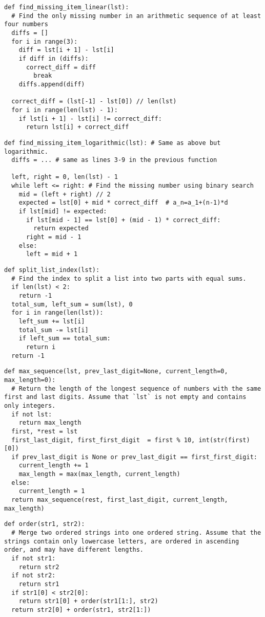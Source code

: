 \documentclass[11pt]{article}
\begin{document}
\begin{lstlisting}
def find_missing_item_linear(lst):
  # Find the only missing number in an arithmetic sequence of at least four numbers
  diffs = []
  for i in range(3):
    diff = lst[i + 1] - lst[i]
    if diff in (diffs):
      correct_diff = diff
        break
    diffs.append(diff)
      
  correct_diff = (lst[-1] - lst[0]) // len(lst)
  for i in range(len(lst) - 1):
    if lst[i + 1] - lst[i] != correct_diff:
      return lst[i] + correct_diff
\end{lstlisting}

\begin{lstlisting}
def find_missing_item_logarithmic(lst): # Same as above but logarithmic.
  diffs = ... # same as lines 3-9 in the previous function

  left, right = 0, len(lst) - 1
  while left <= right: # Find the missing number using binary search
    mid = (left + right) // 2
    expected = lst[0] + mid * correct_diff  # a_n=a_1+(n-1)*d
    if lst[mid] != expected:
      if lst[mid - 1] == lst[0] + (mid - 1) * correct_diff:
        return expected
      right = mid - 1
    else:
      left = mid + 1
\end{lstlisting}

\begin{lstlisting}
def split_list_index(lst):
  # Find the index to split a list into two parts with equal sums.
  if len(lst) < 2:
    return -1
  total_sum, left_sum = sum(lst), 0
  for i in range(len(lst)):
    left_sum += lst[i]
    total_sum -= lst[i]
    if left_sum == total_sum:
      return i
  return -1
\end{lstlisting}

\begin{lstlisting}
def max_sequence(lst, prev_last_digit=None, current_length=0, max_length=0):
  # Return the length of the longest sequence of numbers with the same first and last digits. Assume that `lst` is not empty and contains only integers.
  if not lst:
    return max_length
  first, *rest = lst
  first_last_digit, first_first_digit  = first % 10, int(str(first)[0])
  if prev_last_digit is None or prev_last_digit == first_first_digit:
    current_length += 1
    max_length = max(max_length, current_length)
  else:
    current_length = 1
  return max_sequence(rest, first_last_digit, current_length, max_length)
\end{lstlisting}

\begin{lstlisting}
def order(str1, str2):
  # Merge two ordered strings into one ordered string. Assume that the strings contain only lowercase letters, are ordered in ascending order, and may have different lengths.
  if not str1:
    return str2
  if not str2:
    return str1
  if str1[0] < str2[0]:
    return str1[0] + order(str1[1:], str2)
  return str2[0] + order(str1, str2[1:])
\end{lstlisting}
\end{document}

